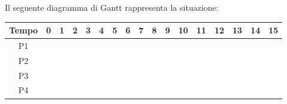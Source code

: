\documentclass[a4paper]{article}
\begin{document}
Il seguente diagramma di Gantt rappresenta la situazione:

\begin{table}[htb]
   \centering
   \begin{tabular}{|c|rlrlrrlrlllr|l|l|l|l|}
      \hline
      Tempo & \multicolumn{1}{l|}{0}                       & \multicolumn{1}{l|}{1}                        & \multicolumn{1}{l|}{2}                        & \multicolumn{1}{l|}{3}                       & \multicolumn{1}{l|}{4} & \multicolumn{1}{l|}{5} & \multicolumn{1}{l|}{6} & \multicolumn{1}{l|}{7} & \multicolumn{1}{l|}{8} & \multicolumn{1}{l|}{9} & \multicolumn{1}{l|}{10} & \multicolumn{1}{l|}{11} & 12 & 13 & 14 & 15 \\ \hline
      P1    & \multicolumn{2}{r}{\cellcolor[HTML]{656565}} & \multicolumn{9}{r}{}                          & \multicolumn{5}{r|}{\cellcolor[HTML]{656565}}                                                                                                                                                                                                                                                                              \\ \hline
      P2    & \multicolumn{2}{r}{}                         & \multicolumn{2}{r}{\cellcolor[HTML]{656565}}  & \multicolumn{1}{r|}{}                         & \multicolumn{2}{r}{\cellcolor[HTML]{656565}} & \multicolumn{9}{r|}{}                                                                                                                                                                                                       \\ \hline
      P3    & \multicolumn{4}{r}{}                         & \multicolumn{1}{r|}{\cellcolor[HTML]{656565}} & \multicolumn{11}{r|}{}                                                                                                                                                                                                                                                                                                     \\ \hline
      P4    & \multicolumn{7}{r}{}                         & \multicolumn{4}{r}{\cellcolor[HTML]{656565}}  & \multicolumn{5}{r|}{}                                                                                                                                                                                                                                                                                                      \\ \hline
   \end{tabular}
\end{table}
\end{document}
